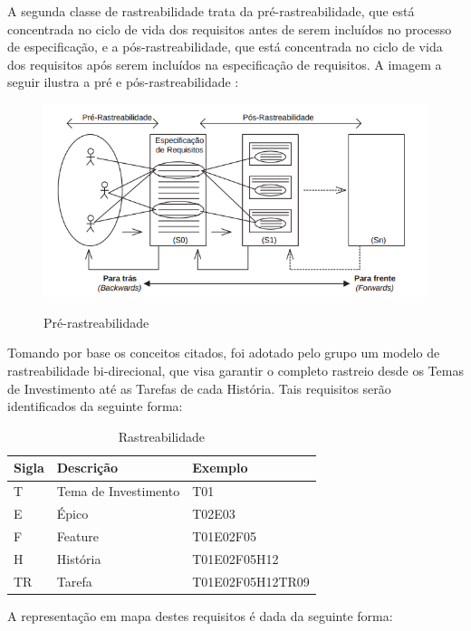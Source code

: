 A segunda classe de rastreabilidade trata da pré-rastreabilidade, que está concentrada no ciclo de vida dos requisitos antes de serem incluídos no processo de especificação, e a pós-rastreabilidade, que está concentrada no ciclo de vida dos requisitos após serem incluídos na especificação de requisitos. A imagem a seguir ilustra a pré e pós-rastreabilidade \cite {inpe}:


\FloatBarrier
\begin{figure}[!htpd]
		\centering
		\includegraphics[scale=0.8]{figuras/rastrabilidadepre}
		\label{img:SAF}
		\caption{Pré-rastreabilidade}
\end{figure}
\FloatBarrier

Tomando por base os conceitos citados, foi adotado pelo grupo um modelo de rastreabilidade bi-direcional, que visa garantir o completo rastreio desde os Temas de Investimento até as Tarefas de cada História. Tais requisitos serão identificados da seguinte forma:

\begin{table}[\htp]
\centering
\caption{Rastreabilidade}
\label{my-label}
\begin{tabular}{|l|l|l|}
\hline
Sigla & Descrição            & Exemplo          \\ \hline
T     & Tema de Investimento & T01              \\ \hline
E     & Épico                & T02E03           \\ \hline
F     & Feature              & T01E02F05        \\ \hline
H     & História             & T01E02F05H12     \\ \hline
TR    & Tarefa               & T01E02F05H12TR09 \\ \hline
\end{tabular}
\end{table}

A representação em mapa destes requisitos é dada da seguinte forma:

